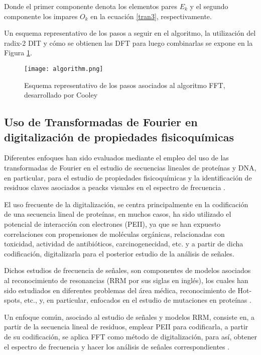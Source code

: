 Donde el primer componente denota los elementos pares $E_k$ y el segundo componente los impares $O_k$ en la ecuación \ref{tran3}, respectivamente.

Un esquema representativo de los pasos a seguir en el algoritmo, la utilización del radix-2 DIT y cómo se obtienen las DFT para luego combinarlas se expone en la Figura \ref{algo}.
\begin{figure}[!h]
	
	\centering
	\texttt{[image: algorithm.png]}
	\caption{Esquema representativo de los pasos asociados al algoritmo FFT, desarrollado por Cooley \cite{cooley1970fast}}
	\label{algo}
\end{figure}

\subsection{Uso de Transformadas de Fourier en digitalización de propiedades fisicoquímicas}

Diferentes enfoques han sido evaluados mediante el empleo del uso de las transformadas de Fourier en el estudio de secuencias lineales de proteínas y DNA, en particular, para el estudio de propiedades fisicoquímicas y la identificación de residuos claves asociados a peacks visuales en el espectro de frecuencia \cite{veljkovic1985possible, cosic1987prediction}. 

El uso frecuente de la digitalización, se centra principalmente en la codificación de una secuencia lineal de proteínas, en muchos casos, ha sido utilizado el potencial de interacción con electrones (PEII), ya que se han expuesto correlaciones con propensiones de moléculas orgánicas, relacionadas con toxicidad, actividad de antibióticos, carcinogenecidad, etc. \cite{veljkovic1985possible, cosic1994macromolecular, cosic1987prediction} y a partir de dicha codificación, digitalizarla para el posterior estudio de la análisis de señales.

Dichos estudios de frecuencia de señales, son componentes de modelos asociados al reconocimiento de resonancias (RRM por sus siglas en inglés), los cuales han sido estudiados en diferentes problemas del área médica, reconocimiento de Hot-spots, etc., y, en particular, enfocados en el estudio de mutaciones en proteínas \cite{cosic1994macromolecular, cosic2016analysis, cosic1987prediction}. 

Un enfoque común, asociado al estudio de señales y modelos RRM, consiste en, a partir de la secuencia lineal de residuos, emplear PEII para codificarla, a partir de su codificación, se aplica FFT como método de digitalización, para así, obtener el espectro de frecuencia y hacer los análisis de señales correspondientes \cite{veljkovic1985possible, cosic1994macromolecular, cosic2016analysis, cosic1987prediction}.

